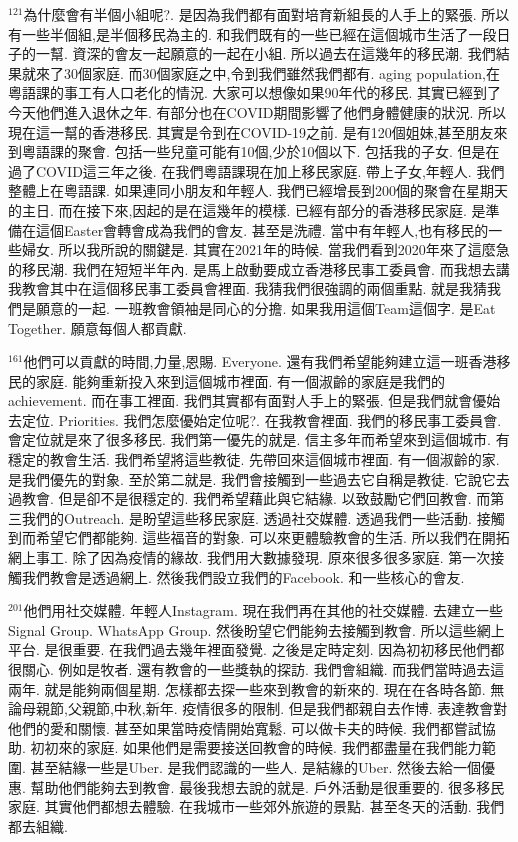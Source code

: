 \documentclass{book}
\begin{document}
$^{121}$為什麼會有半個小組呢?.
是因為我們都有面對培育新組長的人手上的緊張.
所以有一些半個組,是半個移民為主的.
和我們既有的一些已經在這個城市生活了一段日子的一幫.
資深的會友一起願意的一起在小組.
所以過去在這幾年的移民潮.
我們結果就來了30個家庭.
而30個家庭之中,令到我們雖然我們都有.
aging population,在粵語課的事工有人口老化的情況.
大家可以想像如果90年代的移民.
其實已經到了今天他們進入退休之年.
有部分也在COVID期間影響了他們身體健康的狀況.
所以現在這一幫的香港移民.
其實是令到在COVID-19之前.
是有120個姐妹,甚至朋友來到粵語課的聚會.
包括一些兒童可能有10個,少於10個以下.
包括我的子女.
但是在過了COVID這三年之後.
在我們粵語課現在加上移民家庭.
帶上子女,年輕人.
我們整體上在粵語課.
如果連同小朋友和年輕人.
我們已經增長到200個的聚會在星期天的主日.
而在接下來,因起的是在這幾年的模樣.
已經有部分的香港移民家庭.
是準備在這個Easter會轉會成為我們的會友.
甚至是洗禮.
當中有年輕人,也有移民的一些婦女.
所以我所說的關鍵是.
其實在2021年的時候.
當我們看到2020年來了這麼急的移民潮.
我們在短短半年內.
是馬上啟動要成立香港移民事工委員會.
而我想去講我教會其中在這個移民事工委員會裡面.
我猜我們很強調的兩個重點.
就是我猜我們是願意的一起.
一班教會領袖是同心的分擔.
如果我用這個Team這個字.
是Eat Together.
願意每個人都貢獻.

$^{161}$他們可以貢獻的時間,力量,恩賜.
Everyone.
還有我們希望能夠建立這一班香港移民的家庭.
能夠重新投入來到這個城市裡面.
有一個淑齡的家庭是我們的achievement.
而在事工裡面.
我們其實都有面對人手上的緊張.
但是我們就會優始去定位.
Priorities.
我們怎麼優始定位呢?.
在我教會裡面.
我們的移民事工委員會.
會定位就是來了很多移民.
我們第一優先的就是.
信主多年而希望來到這個城市.
有穩定的教會生活.
我們希望將這些教徒.
先帶回來這個城市裡面.
有一個淑齡的家.
是我們優先的對象.
至於第二就是.
我們會接觸到一些過去它自稱是教徒.
它說它去過教會.
但是卻不是很穩定的.
我們希望藉此與它結緣.
以致鼓勵它們回教會.
而第三我們的Outreach.
是盼望這些移民家庭.
透過社交媒體.
透過我們一些活動.
接觸到而希望它們都能夠.
這些福音的對象.
可以來更體驗教會的生活.
所以我們在開拓網上事工.
除了因為疫情的緣故.
我們用大數據發現.
原來很多很多家庭.
第一次接觸我們教會是透過網上.
然後我們設立我們的Facebook.
和一些核心的會友.

$^{201}$他們用社交媒體.
年輕人Instagram.
現在我們再在其他的社交媒體.
去建立一些Signal Group.
WhatsApp Group.
然後盼望它們能夠去接觸到教會.
所以這些網上平台.
是很重要.
在我們過去幾年裡面發覺.
之後是定時定刻.
因為初初移民他們都很關心.
例如是牧者.
還有教會的一些獎執的探訪.
我們會組織.
而我們當時過去這兩年.
就是能夠兩個星期.
怎樣都去探一些來到教會的新來的.
現在在各時各節.
無論母親節,父親節,中秋,新年.
疫情很多的限制.
但是我們都親自去作博.
表達教會對他們的愛和關懷.
甚至如果當時疫情開始寬鬆.
可以做卡夫的時候.
我們都嘗試協助.
初初來的家庭.
如果他們是需要接送回教會的時候.
我們都盡量在我們能力範圍.
甚至結緣一些是Uber.
是我們認識的一些人.
是結緣的Uber.
然後去給一個優惠.
幫助他們能夠去到教會.
最後我想去說的就是.
戶外活動是很重要的.
很多移民家庭.
其實他們都想去體驗.
在我城市一些郊外旅遊的景點.
甚至冬天的活動.
我們都去組織.
\end{document}
